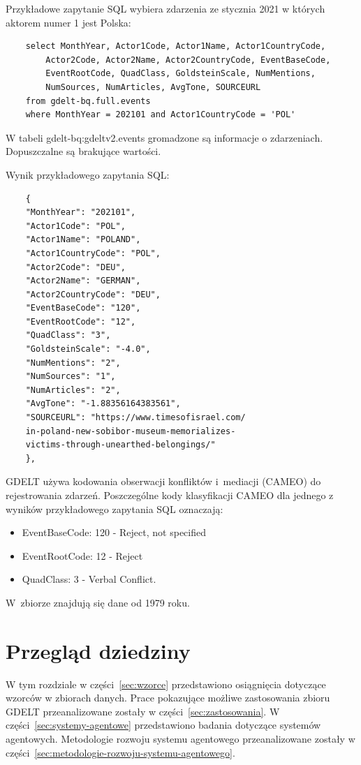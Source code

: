\documentclass[11pt]{report}
\begin{document}
    Przykładowe zapytanie SQL wybiera zdarzenia ze stycznia 2021 w których aktorem numer 1 jest Polska:

    \begin{verbatim}
    select MonthYear, Actor1Code, Actor1Name, Actor1CountryCode,
        Actor2Code, Actor2Name, Actor2CountryCode, EventBaseCode,
        EventRootCode, QuadClass, GoldsteinScale, NumMentions,
        NumSources, NumArticles, AvgTone, SOURCEURL
    from gdelt-bq.full.events
    where MonthYear = 202101 and Actor1CountryCode = 'POL'
    \end{verbatim}

    W tabeli gdelt-bq:gdeltv2.events gromadzone są informacje o zdarzeniach.
    Dopuszczalne są brakujące wartości.

    Wynik przykładowego zapytania SQL:~\begin{verbatim}
    {
    "MonthYear": "202101",
    "Actor1Code": "POL",
    "Actor1Name": "POLAND",
    "Actor1CountryCode": "POL",
    "Actor2Code": "DEU",
    "Actor2Name": "GERMAN",
    "Actor2CountryCode": "DEU",
    "EventBaseCode": "120",
    "EventRootCode": "12",
    "QuadClass": "3",
    "GoldsteinScale": "-4.0",
    "NumMentions": "2",
    "NumSources": "1",
    "NumArticles": "2",
    "AvgTone": "-1.88356164383561",
    "SOURCEURL": "https://www.timesofisrael.com/
    in-poland-new-sobibor-museum-memorializes-
    victims-through-unearthed-belongings/"
    },
    \end{verbatim}

    GDELT używa kodowania obserwacji konfliktów i~mediacji (CAMEO) do rejestrowania zdarzeń.
    Poszczególne kody klasyfikacji CAMEO dla jednego z wyników przykładowego zapytania SQL oznaczają:
    \begin{itemize}
        \item EventBaseCode: 120 - Reject, not specified
        \item EventRootCode: 12 - Reject
        \item QuadClass: 3 - Verbal Conflict.
    \end{itemize}

    W~zbiorze znajdują się dane od 1979 roku.


    \chapter{Przegląd dziedziny}\label{ch:przegląd-dziedziny}
    W tym rozdziale w części~\ref{sec:wzorce} przedstawiono osiągnięcia dotyczące wzorców w zbiorach danych.
    Prace pokazujące możliwe zastosowania zbioru GDELT przeanalizowane zostały w części~\ref{sec:zastosowania}.
    W części~\ref{sec:systemy-agentowe} przedstawiono badania dotyczące systemów agentowych.
    Metodologie rozwoju systemu agentowego przeanalizowane zostały w części~\ref{sec:metodologie-rozwoju-systemu-agentowego}.
\end{document}
